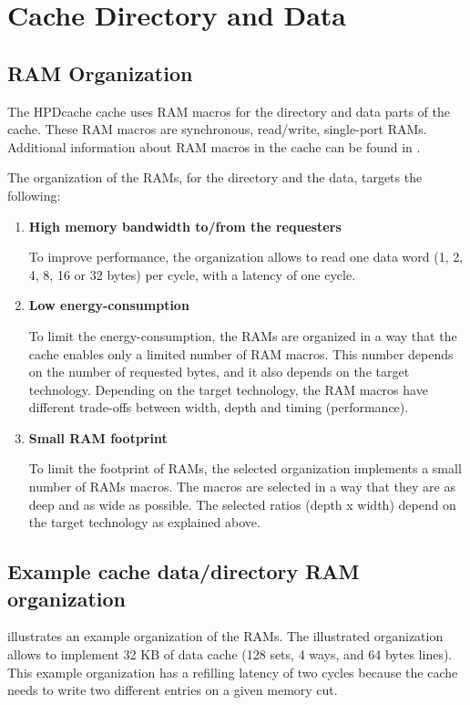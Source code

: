 \documentclass[10pt,titlepage,twoside]{book}
\begin{document}
\section{Cache Directory and Data}

\subsection{RAM Organization}

The \ac{HPDcache} cache uses RAM macros for the directory and data parts of the cache.
These RAM macros are synchronous, read/write, single-port RAMs.
Additional information about RAM macros in the cache can be found in .

The organization of the RAMs, for the directory and the data, targets the following:
\begin{enumerate}[itemsep=1em]
\item {\bf High memory bandwidth to/from the requesters}

To improve performance, the organization allows to read one data word (1, 2, 4, 8, 16 or 32 bytes) per cycle, with a latency of one cycle.

\item {\bf Low energy-consumption}

To limit the energy-consumption, the RAMs are organized in a way that the cache enables only a limited number of RAM macros.
This number depends on the number of requested bytes, and it also depends on the target technology.
Depending on the target technology, the RAM macros have different trade-offs between width, depth and timing (performance).

\item {\bf Small RAM footprint}

To limit the footprint of RAMs, the selected organization implements a small number of RAMs macros.
The macros are selected in a way that they are as deep and as wide as possible.
The selected ratios (depth x width) depend on the target technology as explained above.

\end{enumerate}

\subsection{Example cache data/directory RAM organization}

 illustrates an example organization of the RAMs.
The illustrated organization allows to implement 32 KB of data cache (128 sets, 4 ways, and 64 bytes lines).
This example organization has a refilling latency of two cycles because the cache needs to write two different entries on a given memory cut.
\end{document}
